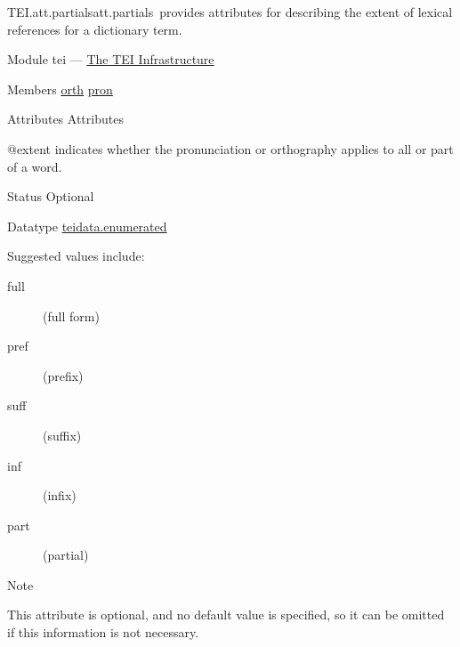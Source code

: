\begin{reflist}
\item[]\begin{specHead}{TEI.att.partials}{att.partials} provides attributes for describing the extent of lexical references for a dictionary term.\end{specHead} 
    \item[{Module}]
  tei — \hyperref[ST]{The TEI Infrastructure}
    \item[{Members}]
  \hyperref[TEI.orth]{orth} \hyperref[TEI.pron]{pron}
    \item[{Attributes}]
  Attributes\hfil\\[-10pt]\begin{sansreflist}
    \item[@extent]
  indicates whether the pronunciation or orthography applies to all or part of a word.
\begin{reflist}
    \item[{Status}]
  Optional
    \item[{Datatype}]
  \hyperref[TEI.teidata.enumerated]{teidata.enumerated}
    \item[{Suggested values include:}]
  \begin{description}

\item[{full}](full form)
\item[{pref}](prefix)
\item[{suff}](suffix)
\item[{inf}](infix)
\item[{part}](partial)
\end{description} 
    \item[{Note}]
  \par
This attribute is optional, and no default value is specified, so it can be omitted if this information is not necessary. 
\end{reflist}  
\end{sansreflist}  
\end{reflist}  
